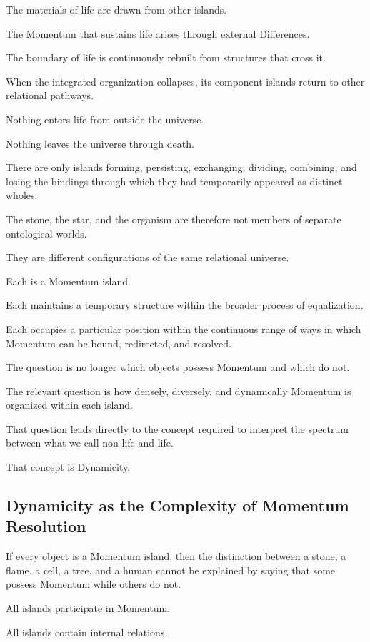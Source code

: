 The materials of life are drawn from other islands.

The Momentum that sustains life arises through external Differences.

The boundary of life is continuously rebuilt from structures that cross it.

When the integrated organization collapses, its component islands return to other relational pathways.

Nothing enters life from outside the universe.

Nothing leaves the universe through death.

There are only islands forming, persisting, exchanging, dividing, combining, and losing the bindings through which they had temporarily appeared as distinct wholes.

The stone, the star, and the organism are therefore not members of separate ontological worlds.

They are different configurations of the same relational universe.

Each is a Momentum island.

Each maintains a temporary structure within the broader process of equalization.

Each occupies a particular position within the continuous range of ways in which Momentum can be bound, redirected, and resolved.

The question is no longer which objects possess Momentum and which do not.

The relevant question is how densely, diversely, and dynamically Momentum is organized within each island.

That question leads directly to the concept required to interpret the spectrum between what we call non-life and life.

That concept is Dynamicity.

\subsection*{\textbf{Dynamicity as the Complexity of Momentum Resolution}} 

If every object is a Momentum island, then the distinction between a stone, a flame, a cell, a tree, and a human cannot be explained by saying that some possess Momentum while others do not.

All islands participate in Momentum.

All islands contain internal relations.

